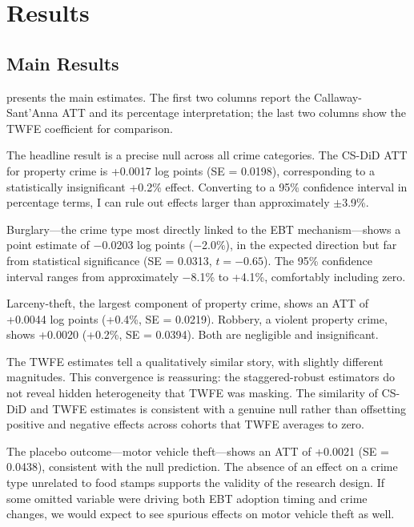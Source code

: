 \documentclass[12pt]{article}
\begin{document}
\section{Results} \label{sec:results}

\subsection{Main Results}

 presents the main estimates. The first two columns report the Callaway-Sant'Anna ATT and its percentage interpretation; the last two columns show the TWFE coefficient for comparison.



The headline result is a precise null across all crime categories. The CS-DiD ATT for property crime is +0.0017 log points (SE = 0.0198), corresponding to a statistically insignificant +0.2\% effect. Converting to a 95\% confidence interval in percentage terms, I can rule out effects larger than approximately $\pm$3.9\%.

Burglary---the crime type most directly linked to the EBT mechanism---shows a point estimate of $-$0.0203 log points ($-$2.0\%), in the expected direction but far from statistical significance (SE = 0.0313, $t = -0.65$). The 95\% confidence interval ranges from approximately $-$8.1\% to +4.1\%, comfortably including zero.

Larceny-theft, the largest component of property crime, shows an ATT of +0.0044 log points (+0.4\%, SE = 0.0219). Robbery, a violent property crime, shows +0.0020 (+0.2\%, SE = 0.0394). Both are negligible and insignificant.

The TWFE estimates tell a qualitatively similar story, with slightly different magnitudes. This convergence is reassuring: the staggered-robust estimators do not reveal hidden heterogeneity that TWFE was masking. The similarity of CS-DiD and TWFE estimates is consistent with a genuine null rather than offsetting positive and negative effects across cohorts that TWFE averages to zero.

The placebo outcome---motor vehicle theft---shows an ATT of +0.0021 (SE = 0.0438), consistent with the null prediction. The absence of an effect on a crime type unrelated to food stamps supports the validity of the research design. If some omitted variable were driving both EBT adoption timing and crime changes, we would expect to see spurious effects on motor vehicle theft as well.
\end{document}
